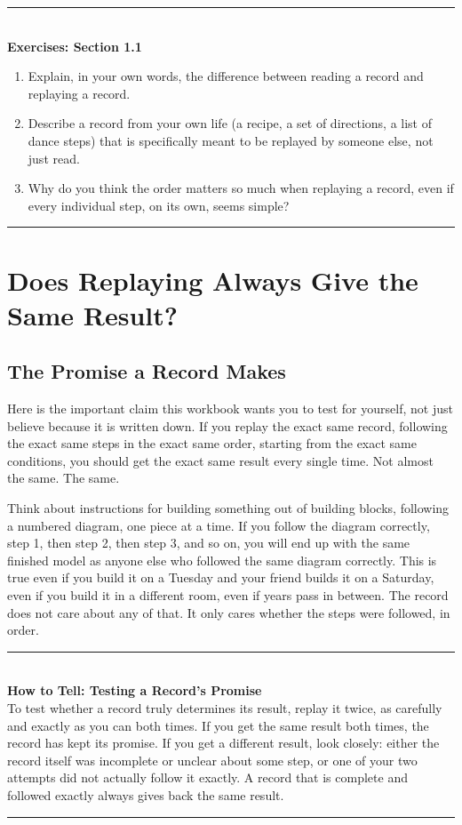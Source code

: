 \documentclass[11pt]{book}
\newenvironment{algorithmproc}[1]{%
\vspace{0.6em}\noindent\rule{\linewidth}{0.6pt}\\[0.2em]\textbf{How to Tell: #1}\\[0.3em]}%
{\\[0.2em]\noindent\rule{\linewidth}{0.6pt}\vspace{0.6em}}
\newenvironment{exercisebox}[1]{%
\vspace{0.8em}\noindent\rule{\linewidth}{0.6pt}\\[0.2em]\textbf{Exercises: #1}\\[0.3em]%
\begin{enumerate}[label=\arabic*., itemsep=0.4em]}%
{\end{enumerate}\noindent\rule{\linewidth}{0.6pt}\vspace{0.6em}}
\begin{document}
\begin{exercisebox}{Section 1.1}
\item Explain, in your own words, the difference between reading a record and replaying a record.
\item Describe a record from your own life (a recipe, a set of directions, a list of dance steps) that is specifically meant to be replayed by someone else, not just read.
\item Why do you think the order matters so much when replaying a record, even if every individual step, on its own, seems simple?
\end{exercisebox}

\chapter{Does Replaying Always Give the Same Result?}

\section{The Promise a Record Makes}

Here is the important claim this workbook wants you to test for yourself, not just believe because it is written down. If you replay the exact same record, following the exact same steps in the exact same order, starting from the exact same conditions, you should get the exact same result every single time. Not almost the same. The same.

Think about instructions for building something out of building blocks, following a numbered diagram, one piece at a time. If you follow the diagram correctly, step 1, then step 2, then step 3, and so on, you will end up with the same finished model as anyone else who followed the same diagram correctly. This is true even if you build it on a Tuesday and your friend builds it on a Saturday, even if you build it in a different room, even if years pass in between. The record does not care about any of that. It only cares whether the steps were followed, in order.

\begin{algorithmproc}{Testing a Record's Promise}
To test whether a record truly determines its result, replay it twice, as carefully and exactly as you can both times. If you get the same result both times, the record has kept its promise. If you get a different result, look closely: either the record itself was incomplete or unclear about some step, or one of your two attempts did not actually follow it exactly. A record that is complete and followed exactly always gives back the same result.
\end{algorithmproc}
\end{document}
